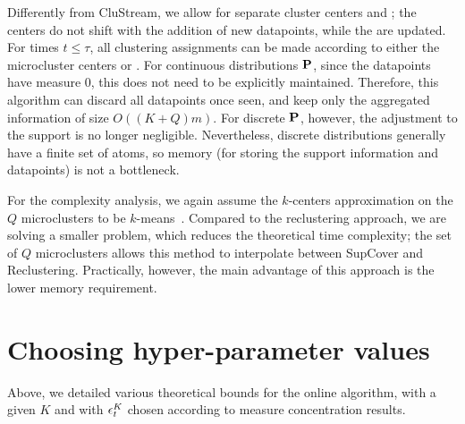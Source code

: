 Differently from CluStream, we allow for separate cluster centers and ; the centers do not shift with the addition of new datapoints, while the  are updated.  
For times $t \leq \tau$, all clustering assignments can be made according to either the microcluster centers or . 
 For continuous distributions ${\mathbf P}$, since the datapoints have measure 0, this does not need to be explicitly maintained. 
Therefore, this algorithm can discard all datapoints once seen, and keep only the aggregated information of size $O((K+Q)m)$. 
For discrete ${\mathbf P}$, however, the adjustment to the support is no longer negligible. Nevertheless, discrete distributions generally have a finite set of atoms, so memory (for storing the support information and datapoints) is not a bottleneck. 


For the complexity analysis, we again assume the $k$-centers approximation on the $Q$ microclusters to be $k$-means~\cite{kmeans}. Compared to the reclustering approach, we are solving a smaller problem, which reduces the theoretical time complexity; the set of $Q$ microclusters allows this method to interpolate between SupCover and Reclustering. 
Practically, however, the main advantage of this approach is the lower memory requirement. 



\section{Choosing hyper-parameter values}
\label{sec:hyper_param}
Above, we detailed various theoretical bounds for the online algorithm, with a given $K$ and with $\epsilon^K_t$ chosen according to measure concentration results. 



